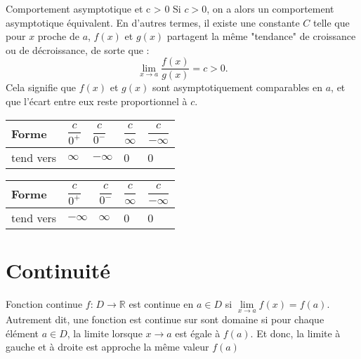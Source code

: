 \documentclass{report}
\begin{document}
\begin{multicols*}{3}
\begin{Concept}{Comportement asymptotique et c > 0}{}
  Si $c > 0$, on a alors un comportement asymptotique équivalent. En d'autres termes, 
  il existe une constante $C$ telle que pour $x$ proche de $a$, $f(x)$ et $g(x)$ 
  partagent la même "tendance" de croissance ou de décroissance, de sorte que :
  \[
  \lim\limits_{x \to a} \frac{f(x)}{g(x)} = c > 0.
  \]
  Cela signifie que $f(x)$ et $g(x)$ sont asymptotiquement comparables en $a$, et que l'écart entre eux reste proportionnel à $c$.
\end{Concept}
  \begin{table}[h]
    \begin{center}
      \renewcommand{\arraystretch}{1.5}
      \selectfont
      \footnotesize
      \begin{tabular}{|l|l|l|l|l|}
      \arrayrulecolor{blue}\hline
      \rowcolor{lightBlue}
      \textcolor{myb}{Forme} & \textcolor{myb}{$\dfrac{c}{0^{+}}$} & \textcolor{myb}{$\dfrac{c}{0^{-}}$}
                             & \textcolor{myb}{$\dfrac{c}{\infty}$} & \textcolor{myb}{$\dfrac{c}{-\infty}$}
      \\
      \hline
      \hline
      \arrayrulecolor{black}
      tend vers & $\infty$ & $-\infty$ & 0 & 0 
      \\
      \hline
      

  \end{tabular}
  \end{center}
  \end{table}



  \begin{table}[h]
    \begin{center}
      \renewcommand{\arraystretch}{1.5}
      \selectfont
      \footnotesize
      \begin{tabular}{|l|l|l|l|l|}
      \arrayrulecolor{blue}\hline
      \rowcolor{lightBlue}
      \textcolor{myb}{Forme} & \textcolor{myb}{$\dfrac{c}{0^{+}}$} & \textcolor{myb}{$\dfrac{c}{0^{-}}$}
                             & \textcolor{myb}{$\dfrac{c}{\infty}$} & \textcolor{myb}{$\dfrac{c}{-\infty}$}
      \\
      \hline
      \hline
      \arrayrulecolor{black}
      tend vers & $-\infty$ & $\infty$ & 0 & 0 
      \\
      \hline
      

  \end{tabular}
  \end{center}
  \end{table}
\section{Continuité}
\begin{Concept}{Fonction continue}{}
  $f\text{:} \; D \rightarrow \mathbb{R}$ est \textcolor{myb}{continue}   en $a \in D$ si $\lim\limits_{x\to a} f(x) = f(a)$. 
  Autrement dit, une fonction est continue sur sont domaine si pour chaque élément $a \in D$, la limite 
  lorsque $x \rightarrow a$ est égale à $f(a)$. Et donc, la limite à gauche et à droite est approche 
  la même valeur $f(a)$
\end{Concept}


\end{multicols*}
\end{document}
